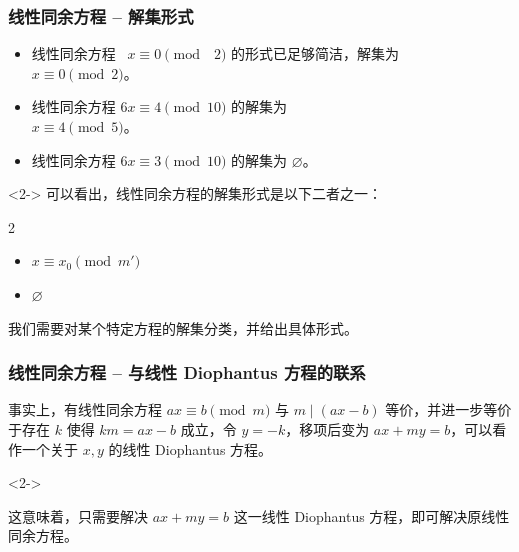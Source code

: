\documentclass{../pkslide}
\begin{document}
\begin{frame}
  \frametitle{线性同余方程 -- 解集形式}
  \begin{examples}[线性同余方程的解集]
    \begin{itemize}
      \item 线性同余方程 $\phantom{1}x \equiv 0 \pmod{\phantom{0}2}$ 的形式已足够简洁，解集为\\
        \-\hspace{2em}$x \equiv 0 \pmod{2}$。
      \item 线性同余方程 $6 x \equiv 4 \pmod{10}$ 的解集为\\
        \-\hspace{2em}$x \equiv 4 \pmod{5}$。
      \item 线性同余方程 $6 x \equiv 3 \pmod{10}$ 的解集为 $\varnothing$。
    \end{itemize}
  \end{examples}
  
  \begin{uncoverenv}<2->
    可以看出，线性同余方程的解集形式是以下二者之一：
    
    \begin{mymulticols}[l][l]{2}
      \begin{itemize}
        \item $x \equiv x_0 \pmod{m'}$
        \item $\varnothing$
      \end{itemize}
    \end{mymulticols}

    \emptyline
    
    我们需要对某个特定方程的解集分类，并给出具体形式。
  \end{uncoverenv}
\end{frame}

\begin{frame}
  \frametitle{线性同余方程 -- 与线性 Diophantus 方程的联系}
  事实上，有线性同余方程 $a x \equiv b \pmod{m}$ 与 $m \mid (a x - b)$ 等价，并进一步等价于存在 $k$ 使得 $k m = a x - b$ 成立，令 $y = -k$，移项后变为 $a x + m y = b$，可以看作一个关于 $x, y$ 的线性 Diophantus 方程。
  
  \begin{uncoverenv}<2->
    \emptyline
    
    这意味着，只需要解决 $a x + m y = b$ 这一线性 Diophantus 方程，即可解决原线性同余方程。
  \end{uncoverenv}
\end{frame}
\end{document}
